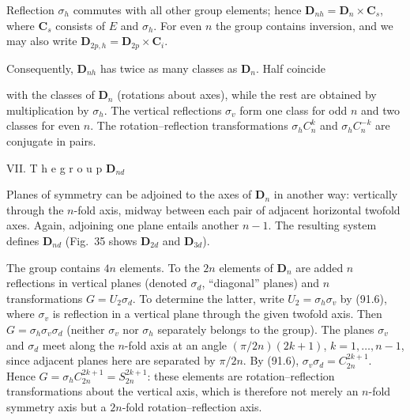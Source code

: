 \begin{figure}[ht]
\centering
{}
\caption{}
\label{fig:93-35}
\end{figure}

Reflection $\sigma_h$ commutes with all other group elements; hence $\boldsymbol{D}_{nh}=\boldsymbol{D}_n\times\boldsymbol{C}_s$, where $\boldsymbol{C}_s$ consists of $E$ and $\sigma_h$. For even $n$ the group contains inversion, and we may also write $\boldsymbol{D}_{2p,h}=\boldsymbol{D}_{2p}\times\boldsymbol{C}_i$.

Consequently, $\boldsymbol{D}_{nh}$ has twice as many classes as $\boldsymbol{D}_n$. Half coincide

with the classes of $\boldsymbol{D}_n$ (rotations about axes), while the rest are obtained by multiplication by $\sigma_h$. The vertical reflections $\sigma_v$ form one class for odd $n$ and two classes for even $n$. The rotation--reflection transformations $\sigma_hC_n^k$ and $\sigma_hC_n^{-k}$ are conjugate in pairs.

\medskip
\noindent VII. T h e  g r o u p $\boldsymbol{D}_{nd}$

Planes of symmetry can be adjoined to the axes of $\boldsymbol{D}_n$ in another way: vertically through the $n$-fold axis, midway between each pair of adjacent horizontal twofold axes. Again, adjoining one plane entails another $n-1$. The resulting system defines $\boldsymbol{D}_{nd}$ (Fig.~35 shows $\boldsymbol{D}_{2d}$ and $\boldsymbol{D}_{3d}$).

The group contains $4n$ elements. To the $2n$ elements of $\boldsymbol{D}_n$ are added $n$ reflections in vertical planes (denoted $\sigma_d$, “diagonal” planes) and $n$ transformations $G=U_2\sigma_d$. To determine the latter, write $U_2=\sigma_h\sigma_v$ by (91.6), where $\sigma_v$ is reflection in a vertical plane through the given twofold axis. Then $G=\sigma_h\sigma_v\sigma_d$ (neither $\sigma_v$ nor $\sigma_h$ separately belongs to the group). The planes $\sigma_v$ and $\sigma_d$ meet along the $n$-fold axis at an angle $(\pi/2n)(2k+1)$, $k=1,\ldots,n-1$, since adjacent planes here are separated by $\pi/2n$. By (91.6), $\sigma_v\sigma_d=C_{2n}^{2k+1}$. Hence $G=\sigma_hC_{2n}^{2k+1}=S_{2n}^{2k+1}$: these elements are rotation--reflection transformations about the vertical axis, which is therefore not merely an $n$-fold symmetry axis but a $2n$-fold rotation--reflection axis.

